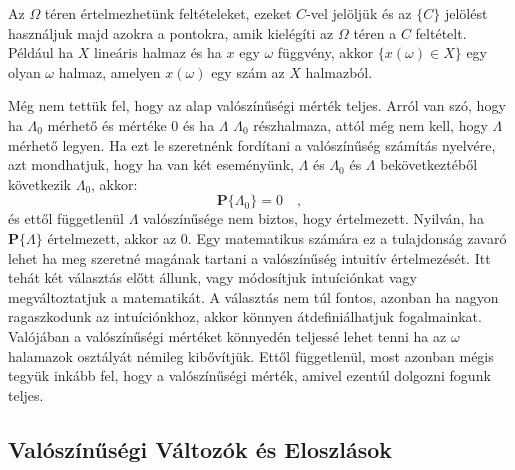 \documentclass{article}
\begin{document}
Az $\Omega$ téren értelmezhetünk feltételeket, ezeket $C$-vel jelöljük és az $\{C\}$ jelölést használjuk majd azokra a pontokra, amik kielégíti az $\Omega$ téren a $C$ feltételt. Például ha $X$ lineáris halmaz és ha $x$ egy $\omega$ függvény, akkor $\{x(\omega) \in X\}$ egy olyan $\omega$ halmaz, amelyen $x(\omega)$ egy szám az $X$ halmazból.

Még nem tettük fel, hogy az alap valószínűségi mérték teljes. Arról van szó, hogy ha $\Lambda_0$ mérhető és mértéke $0$ és ha $\Lambda$ $\Lambda_0$ részhalmaza, attól még nem kell, hogy $\Lambda$ mérhető legyen. Ha ezt le szeretnénk fordítani a valószínűség számítás nyelvére, azt mondhatjuk, hogy ha van két eseményünk, $\Lambda$ és $\Lambda_0$ és $\Lambda$ bekövetkeztéből következik $\Lambda_0$, akkor:
\begin{equation}
\mathbf{P}\{\Lambda_0\} = 0 \quad ,
\end{equation}
és ettől függetlenül $\Lambda$ valószínűsége nem biztos, hogy értelmezett. Nyilván, ha $\mathbf{P}\{\Lambda\}$ értelmezett, akkor az $0$. Egy matematikus számára ez a tulajdonság zavaró lehet ha meg szeretné magának tartani a valószínűség intuitív értelmezését. Itt tehát két választás előtt állunk, vagy módosítjuk intuíciónkat vagy megváltoztatjuk a matematikát. A választás nem túl fontos, azonban ha nagyon ragaszkodunk az intuíciónkhoz, akkor könnyen átdefiniálhatjuk fogalmainkat. Valójában a valószínűségi mértéket könnyedén teljessé lehet tenni ha az $\omega$ halamazok osztályát némileg kibővítjük. Ettől függetlenül, most azonban mégis tegyük inkább fel, hogy a valószínűségi mérték, amivel ezentúl dolgozni fogunk teljes.

\subsection{Valószínűségi Változók és Eloszlások}
\end{document}

